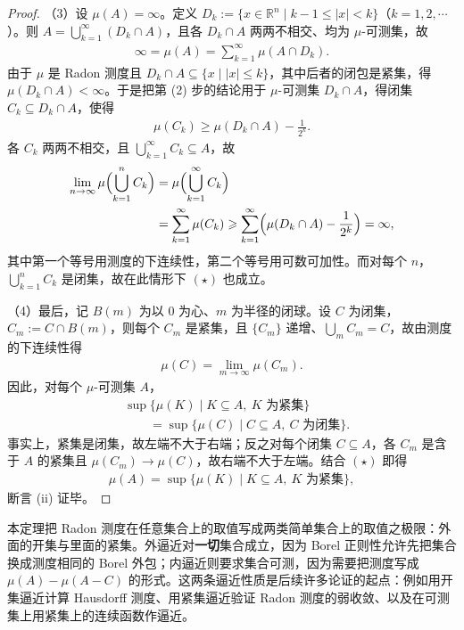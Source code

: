 \documentclass[../../main.tex]{subfiles}
\begin{document}
\begin{proof}
（3）设 $\mu(A)=\infty$。定义 $D_{k}:=\{x\in\mathbb{R}^{n}\mid k-1\leqslant|x|<k\}$（$k=1,2,\cdots$）。则 $A=\bigcup_{k=1}^{\infty}(D_{k}\cap A)$，且各 $D_{k}\cap A$ 两两不相交、均为 $\mu$-可测集，故
\begin{align*}
\infty=\mu(A)=\sum_{k=1}^{\infty}\mu(A\cap D_{k}).
\end{align*}
由于 $\mu$ 是 Radon 测度且 $D_{k}\cap A\subseteq\{x\mid|x|\leqslant k\}$，其中后者的闭包是紧集，得 $\mu(D_{k}\cap A)<\infty$。于是把第 (2) 步的结论用于 $\mu$-可测集 $D_{k}\cap A$，得闭集 $C_{k}\subseteq D_{k}\cap A$，使得
\begin{align*}
\mu(C_{k})\geqslant\mu(D_{k}\cap A)-\frac{1}{2^{k}}.
\end{align*}
各 $C_{k}$ 两两不相交，且 $\bigcup_{k=1}^{\infty}C_{k}\subseteq A$，故
\begin{align*}
\lim_{n\to\infty}\mu\Bigl(\bigcup_{k=1}^{n}C_{k}\Bigr)&=\mu\Bigl(\bigcup_{k=1}^{\infty}C_{k}\Bigr)\\
&=\sum_{k=1}^{\infty}\mu(C_{k})\geqslant\sum_{k=1}^{\infty}\Bigl(\mu(D_{k}\cap A)-\frac{1}{2^{k}}\Bigr)=\infty,
\end{align*}
其中第一个等号用测度的下连续性，第二个等号用可数可加性。而对每个 $n$，$\bigcup_{k=1}^{n}C_{k}$ 是闭集，故在此情形下 $(\star)$ 也成立。

（4）最后，记 $B(m)$ 为以 $0$ 为心、$m$ 为半径的闭球。设 $C$ 为闭集，$C_{m}:=C\cap B(m)$，则每个 $C_{m}$ 是紧集，且 $\{C_{m}\}$ 递增、$\bigcup_{m}C_{m}=C$，故由测度的下连续性得
\begin{align*}
\mu(C)=\lim_{m\to\infty}\mu(C_{m}).
\end{align*}
因此，对每个 $\mu$-可测集 $A$，
\begin{align*}
&\sup\{\mu(K)\mid K\subseteq A,\ K\text{ 为紧集}\}\\
&\qquad=\sup\{\mu(C)\mid C\subseteq A,\ C\text{ 为闭集}\}.
\end{align*}
事实上，紧集是闭集，故左端不大于右端；反之对每个闭集 $C\subseteq A$，各 $C_{m}$ 是含于 $A$ 的紧集且 $\mu(C_{m})\to\mu(C)$，故右端不大于左端。结合 $(\star)$ 即得
\begin{align*}
\mu(A)=\sup\{\mu(K)\mid K\subseteq A,\ K\text{ 为紧集}\},
\end{align*}
断言 (ii) 证毕。
\end{proof}

\begin{remark}\label{remark:ch01-thm-1-8-动机}
本定理把 Radon 测度在任意集合上的取值写成两类简单集合上的取值之极限：外面的开集与里面的紧集。外逼近对\textbf{一切}集合成立，因为 Borel 正则性允许先把集合换成测度相同的 Borel 外包；内逼近则要求集合可测，因为需要把测度写成 $\mu(A)-\mu(A-C)$ 的形式。这两条逼近性质是后续许多论证的起点：例如用开集逼近计算 Hausdorff 测度、用紧集逼近验证 Radon 测度的弱收敛、以及在可测集上用紧集上的连续函数作逼近。
\end{remark}
\end{document}
